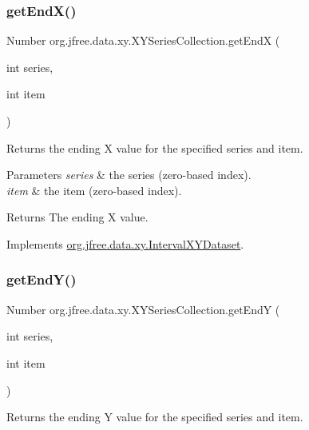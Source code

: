 \subsubsection{\texorpdfstring{get\+End\+X()}{getEndX()}}
{\footnotesize\ttfamily Number org.\+jfree.\+data.\+xy.\+X\+Y\+Series\+Collection.\+get\+EndX (\begin{DoxyParamCaption}\item[{int}]{series,  }\item[{int}]{item }\end{DoxyParamCaption})}

Returns the ending X value for the specified series and item.


\begin{DoxyParams}{Parameters}
{\em series} & the series (zero-\/based index). \\
\hline
{\em item} & the item (zero-\/based index).\\
\hline
\end{DoxyParams}
\begin{DoxyReturn}{Returns}
The ending X value. 
\end{DoxyReturn}


Implements \mbox{\hyperlink{interfaceorg_1_1jfree_1_1data_1_1xy_1_1_interval_x_y_dataset_a93161a6d6c1db37cfac030239c62ab0a}{org.\+jfree.\+data.\+xy.\+Interval\+X\+Y\+Dataset}}.

\mbox{\label{classorg_1_1jfree_1_1data_1_1xy_1_1_x_y_series_collection_a4c7808581b7aa99391293de0a7cb0cc4}} 
\subsubsection{\texorpdfstring{get\+End\+Y()}{getEndY()}}
{\footnotesize\ttfamily Number org.\+jfree.\+data.\+xy.\+X\+Y\+Series\+Collection.\+get\+EndY (\begin{DoxyParamCaption}\item[{int}]{series,  }\item[{int}]{item }\end{DoxyParamCaption})}

Returns the ending Y value for the specified series and item.


